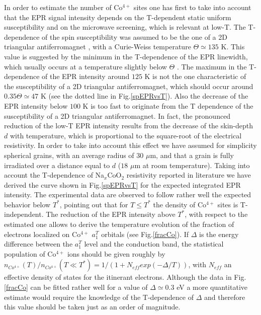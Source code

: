 \documentclass[prb,showpacs,preprintnumbers,amsmath,amssymb,floatfix]{revtex4}
\begin{document}
In order to estimate the number of Co$^{4+}$ sites one has first
to take into account that the EPR signal intensity depends on the
T-dependent static uniform susceptibility and on the microwave
screening, which is relevant at low-T. The T-dependence of the
spin susceptibility was assumed to be the one of a 2D triangular
antiferromagnet \cite{ChiTALAF}, with a Curie-Weiss temperature
$\Theta\simeq 135$ K. This value is suggested by the minimum in
the T-dependence of the EPR linewidth, which usually occurs at a
temperature slightly below $\Theta$ \cite{Richards,MnCl2}. The
maximum in the T-dependence of the EPR intensity around $125$ K is
not the one characteristic of the susceptibility of a 2D
triangular antiferromagnet, which should occur around $0.35
\Theta\simeq 47$ K (see the dotted line in Fig.\ref{spEPRvsT}).
Also the decrease of the EPR intensity below $100$ K is too fast
to originate from the T dependence of the susceptibility of a 2D
triangular antiferromagnet. In fact, the pronounced reduction of
the low-T EPR intensity results from the decrease of the
skin-depth $d$ with temperature, which is proportional to the
square-root of the electrical resistivity. In order to take into
account this effect we have assumed for simplicity spherical
grains, with an average radius of $30$ $\mu$m, and that a grain is
fully irradiated over a distance equal to $d$ ($18$ $\mu$m at room
temperature). Taking into account the T-dependence of
Na$_x$CoO$_2$ resistivity reported in literature we have derived
the curve shown in Fig.\ref{spEPRvsT} for the expected integrated
EPR intensity. The experimental data are observed to follow rather
well the expected behavior below $T^*$, pointing out that for
$T\leq T^*$ the density of Co$^{4+}$ sites is T-independent. The
reduction of the EPR intensity above $T^*$, with respect to the
estimated one allows to derive the temperature evolution of the
fraction of electrons localized on Co$^{4+}$ $a_1^T$ orbitals (see
Fig.\ref{fracCo}). If $\Delta$ is the energy difference between
the $a_1^T$ level and the conduction band, the statistical
population of Co$^{4+}$ ions should be given roughly by
$n_{Co^{4+}}(T)/n_{Co^{4+}}(T\ll T^*)=1/(1+
N_{eff}exp(-\Delta/T))$, with $N_{eff}$ an effective density of
states for the itinerant electrons. Although the data in
Fig.\ref{fracCo} can be fitted rather well for a value of
$\Delta\simeq 0.3$ eV a more quantitative estimate would require
the knowledge of the T-dependence of $\Delta$ and therefore this
value should be taken just as an order of magnitude.
\end{document}
